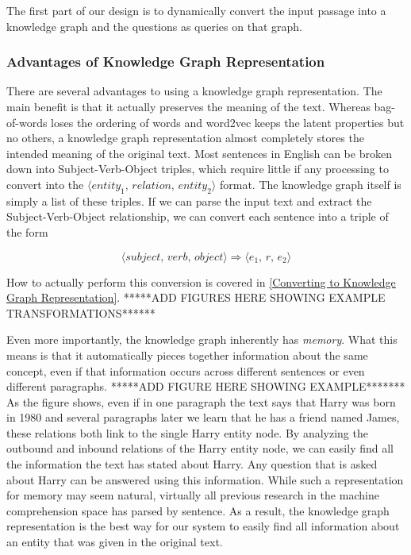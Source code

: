 \documentclass[pageno]{jpaper}
\begin{document}
The first part of our design is to dynamically convert the input passage into a
knowledge graph and the questions as queries on that graph. \\

\subsubsection{Advantages of Knowledge Graph Representation}
\label{Advantages of Knowledge Graph Representation}

There are several advantages to using a knowledge graph representation. The main
benefit is that it actually preserves the meaning of the text. Whereas
bag-of-words loses the ordering of words and word2vec keeps the latent
properties but no others, a knowledge graph representation almost completely
stores the intended meaning of the original text. Most sentences in English can
be broken down into Subject-Verb-Object triples, which require little if any
processing to convert into the $\langle \textit{entity}_1, \, \textit{relation}, \,
\textit{entity}_2 \rangle$ format. The knowledge graph itself is simply a list of
these triples. If we can parse the input text and extract the
Subject-Verb-Object relationship, we can convert each sentence into a triple of
the form

$$\langle \textit{subject}, \, \textit{verb}, \, \textit{object} \rangle
\Rightarrow \langle e_1, \, r, \, e_2 \rangle$$

How to actually perform this conversion is covered in \ref{Converting to
Knowledge Graph Representation}. *****ADD FIGURES HERE SHOWING EXAMPLE TRANSFORMATIONS******

Even more importantly, the knowledge graph inherently has \textit{memory}. What
this means is that it automatically pieces together information about the same
concept, even if that information occurs across different sentences or even
different paragraphs. *****ADD FIGURE HERE SHOWING EXAMPLE******* As the figure
shows, even if in one paragraph the text says that Harry was born in 1980 and
several paragraphs later we learn that he has a friend named James, these
relations both link to the single Harry entity node. By analyzing the outbound
and inbound relations of the Harry entity node, we can easily find all the
information the text has stated about Harry. Any question that is asked about
Harry can be answered using this information. While such a representation for
memory may seem natural, virtually all previous research in the machine
comprehension space has parsed by sentence. As a result, the knowledge graph
representation is the best way for our system to easily find all information
about an entity that was given in the original text.
\end{document}
